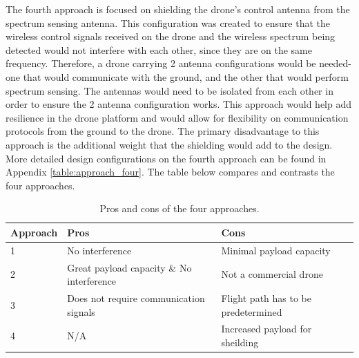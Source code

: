 The fourth approach is focused on shielding the drone’s control antenna from the spectrum sensing antenna. This configuration was created to ensure that the wireless control signals received on the drone and the wireless spectrum being detected would not interfere with each other, since they are on the same frequency. Therefore, a drone carrying 2 antenna configurations would be needed- one that would communicate with the ground, and the other that would perform spectrum sensing. The antennas would need to be isolated from each other in order to ensure the 2 antenna configuration works. This approach would help add resilience in the drone platform and would allow for flexibility on communication protocols from the ground to the drone. The primary disadvantage to this approach is the additional weight that the shielding would add to the design. More detailed design configurations on the fourth approach can be found in Appendix \ref{table:approach_four}. The table below compares and contrasts the four approaches.
\begin{table}[ht]
\centering
\caption{Pros and cons of the four approaches.}
\label{table:multi_pc}
\begin{tabular}{|l|l|l|}
	\hline 
  Approach & Pros & Cons \\ \hline
  1 & No interference & Minimal payload capacity \\
  2 & Great payload capacity \& No interference & Not a commercial drone \\
  3 & Does not require communication signals & Flight path has to be predetermined \\ 
  4 & N/A & Increased payload for sheilding \\ \hline
\end{tabular}
\end{table}

